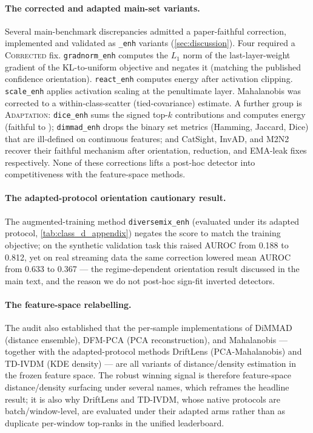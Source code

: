 \paragraph{The corrected and adapted main-set variants.}
Several main-benchmark discrepancies admitted a paper-faithful correction,
implemented and validated as \texttt{\_enh} variants (\cref{sec:discussion}). Four
required a \textsc{Corrected} fix. \texttt{gradnorm\_enh} computes the $L_1$ norm of
the last-layer-weight gradient of the KL-to-uniform objective and negates it
(matching the published confidence orientation). \texttt{react\_enh} computes energy
after activation clipping. \texttt{scale\_enh} applies activation scaling at the
penultimate layer. Mahalanobis was corrected to a within-class-scatter
(tied-covariance) estimate. A further group is \textsc{Adaptation}: \texttt{dice\_enh}
sums the signed top-$k$ contributions and computes energy (faithful to
\citet{Sun2022}); \texttt{dimmad\_enh} drops the binary set metrics (Hamming,
Jaccard, Dice) that are ill-defined on continuous features; and CatSight, InvAD, and
M2N2 recover their faithful mechanism after orientation, reduction, and EMA-leak
fixes respectively. None of these corrections lifts a post-hoc detector into
competitiveness with the feature-space methods.

\paragraph{The adapted-protocol orientation cautionary result.}
The augmented-training method \texttt{diversemix\_enh} (evaluated under its adapted
protocol, \cref{tab:class_d_appendix}) negates the score to match the training
objective; on the synthetic validation task this raised AUROC from \num{0.188} to
\num{0.812}, yet on real streaming data the same correction lowered mean AUROC from
\num{0.633} to \num{0.367} --- the regime-dependent orientation result discussed in
the main text, and the reason we do not post-hoc sign-fit inverted detectors.

\paragraph{The feature-space relabelling.}
The audit also established that the per-sample implementations of DiMMAD (distance
ensemble), DFM-PCA (PCA reconstruction), and Mahalanobis --- together with the
adapted-protocol methods DriftLens (PCA-Mahalanobis) and TD-IVDM (KDE density) --- are all
variants of distance/density estimation in the frozen feature space. The robust
winning signal is therefore feature-space distance/density surfacing under several
names, which reframes the headline result; it is also why DriftLens and TD-IVDM,
whose native protocols are batch/window-level, are evaluated under their adapted
arms rather than as duplicate per-window top-ranks in the unified leaderboard.

